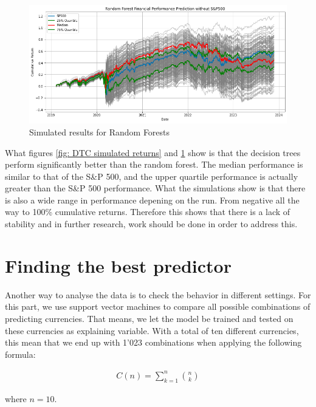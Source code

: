\begin{figure}[h!]
\begin{center}
  \includegraphics[width=\textwidth]{images/rf_sim.png}
  \end{center}
  \caption[Simulated results for Random Forests]{Simulated results for Random Forests}
  \label{fig: RFC simulated returns}
\end{figure}

What figures \ref{fig: DTC simulated returns} and \ref{fig: RFC simulated returns} show is that the decision trees perform significantly better than the random forest. The median performance is similar to that of the S\&P 500, and the upper quartile performance is actually greater than the S\&P 500 performance. What the simulations show is that there is also a wide range in performance depening on the run. From negative all the way to 100\% cumulative returns. Therefore this shows that there is a lack of stability and in further research, work should be done in order to address this.

\section{Finding the best predictor}
\label{Finding the best predictor}
Another way to analyse the data is to check the behavior in different settings. For this part, we use support vector machines to compare all possible combinations of predicting currencies. That means, we let the model be trained and tested on these currencies as explaining variable. With a total of ten different currencies, this mean that we end up with 1'023 combinations when applying the following formula:

\begin{align}
    C(n) = \sum_{k=1}^{n} \binom{n}{k}
\end{align}

where $n=10$.

